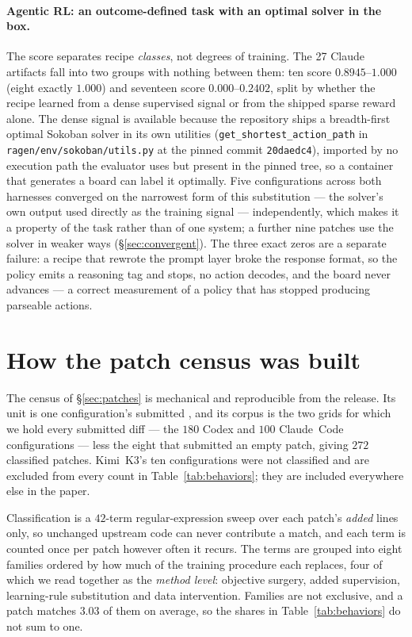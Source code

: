 \paragraph{Agentic RL: an outcome-defined task with an optimal solver in the box.} The score separates
recipe \emph{classes}, not degrees of training. The 27 Claude artifacts fall into two groups with
nothing between them: ten score $0.8945$--$1.000$ (eight exactly $1.000$) and seventeen score
$0.000$--$0.2402$, split by whether the recipe learned from a dense supervised signal or from the
shipped sparse reward alone. The dense signal is available because the repository ships a breadth-first
optimal Sokoban solver in its own utilities (\texttt{get\_shortest\_action\_path} in
\texttt{ragen/env/sokoban/utils.py} at the pinned commit \texttt{20daedc4}), imported by no execution
path the evaluator uses but present in the pinned tree, so a container that generates a board can label
it optimally. Five configurations across both harnesses converged on the narrowest form of
this substitution --- the solver's own output used directly as the training signal --- independently,
which makes it a property of the task rather than of one system; a further nine patches use the solver
in weaker ways (\S\ref{sec:convergent}). The three exact zeros are a separate
failure: a recipe that rewrote the prompt layer broke the response format, so the policy emits a
reasoning tag and stops, no action decodes, and the board never advances --- a correct measurement of a
policy that has stopped producing parseable actions.

\section{How the patch census was built}
\label{app:behaviors}
\label{app:patches}

The census of \S\ref{sec:patches} is mechanical and reproducible from the release. Its unit is one
configuration's submitted \patchfile{}, and its corpus is the two grids for which we hold every
submitted diff --- the $180$ Codex and $100$ Claude~Code configurations --- less the eight that
submitted an empty patch, giving $272$ classified patches. Kimi~K3's ten configurations were not
classified and are excluded from every count in Table~\ref{tab:behaviors}; they are included
everywhere else in the paper.

Classification is a $42$-term regular-expression sweep over each patch's \emph{added} lines only, so
unchanged upstream code can never contribute a match, and each term is counted once per patch however
often it recurs. The terms are grouped into eight families ordered by how much of the training
procedure each replaces, four of which we read together as the \emph{method level}: objective
surgery, added supervision, learning-rule substitution and data intervention. Families are not
exclusive, and a patch matches $3.03$ of them on average, so the shares in Table~\ref{tab:behaviors}
do not sum to one.

